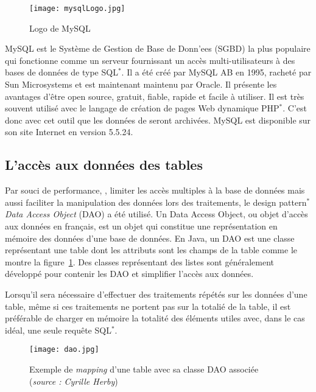 \begin{figure}[!ht]
	\centering
	\texttt{[image: mysqlLogo.jpg]}
	\caption{Logo de MySQL}
	
\end{figure}

MySQL est le Syst\`eme de Gestion de Base de Donn'ees (SGBD) la plus populaire qui fonctionne comme un serveur fournissant un acc\`es multi-utilisateurs \`a des bases de donn\'ees de type SQL$^*$.
Il a \'et\'e cr\'e\'e par MySQL AB en 1995, rachet\'e par Sun Microsystems et est maintenant maintenu par Oracle.
Il pr\'esente les avantages d'\^etre open source, gratuit, fiable, rapide et facile \`a utiliser.
Il est tr\`es souvent utilis\'e avec le langage de cr\'eation de pages Web dynamique PHP$^*$.
C'est donc avec cet outil que les donn\'ees de {\YuukouII} seront archiv\'ees.
MySQL est disponible sur son site Internet\cite{biblio:siteMySQL} en version 5.5.24.


\subsection{L'acc\`es aux donn\'ees des tables}

Par souci de performance, \cad, limiter les acc\`es multiples \`a la base de donn\'ees mais aussi faciliter la manipulation des donn\'ees lors des traitements, le design pattern$^*$ \textit{Data Access Object} (DAO) a \'et\'e utilis\'e.
Un Data Access Object, ou objet d'acc\`es aux donn\'ees en fran\c{c}ais, est un objet qui constitue une repr\'esentation en m\'emoire des donn\'ees d'une base de donn\'ees.
En Java, un DAO est une classe repr\'esentant une table dont les attributs sont les champs de la table comme le montre la figure~\ref{figure:dao}.
Des classes repr\'esentant des listes sont g\'en\'eralement d\'evelopp\'e pour contenir les DAO et simplifier l'acc\`es aux donn\'ees.

Lorsqu'il sera n\'ecessaire d'effectuer des traitements r\'ep\'et\'es sur les donn\'ees d'une table, m\^eme si ces traitements ne portent pas sur la totali\'e de la table, il est pr\'ef\'erable de charger en m\'emoire la totalit\'e des \'el\'ements utiles avec, dans le cas id\'eal, une seule requ\^ete SQL$^*$.

\begin{figure}[!ht]
	\centering
	\texttt{[image: dao.jpg]}
	\caption{Exemple de \textit{mapping} d'une table avec sa classe DAO associ\'ee (\textit{source : Cyrille Herby})}
	\label{figure:dao}

\end{figure}

